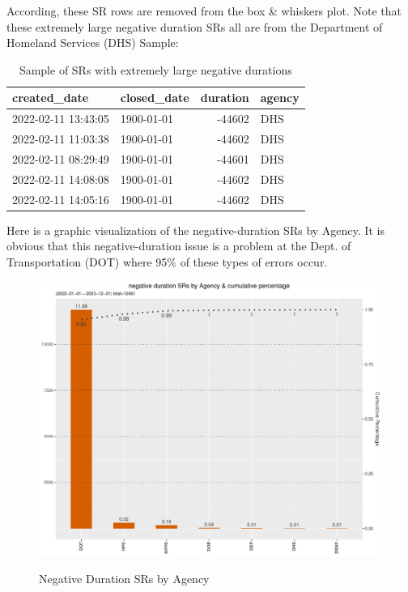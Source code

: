 \documentclass[12pt, titlepage]{article}
\begin{document}
{According, these  SR rows are removed from the box \& whiskers plot. Note that these extremely large negative duration SRs all
are from the Department of Homeland Services (DHS) Sample: 

\begin{table}[tbp]
    \centering
    \caption{Sample of SRs with extremely large negative durations}
    \normalsize
    \begin{tabular}{l l r l}
        \toprule
        \textbf{created\_date} & \textbf{closed\_date} & \textbf{duration} & \textbf{agency} \\
	        \midrule
	        2022-02-11 13:43:05 & 1900-01-01 & -44602 & DHS \\
	        2022-02-11 11:03:38 & 1900-01-01 & -44602 & DHS \\
	        2022-02-11 08:29:49 & 1900-01-01 & -44601 & DHS \\
	        2022-02-11 14:08:08 & 1900-01-01 & -44602 & DHS \\
	        2022-02-11 14:05:16 & 1900-01-01 & -44602 & DHS \\
	        \bottomrule
    \end{tabular}
    \label{tab:extreme_negative_durations}
\end{table}

Here is a graphic visualization of the negative-duration SRs by Agency. It is obvious that this
negative-duration issue is a problem at the Dept. of Transportation (DOT) where 95\% of these
types of errors occur. 

\begin{figure}[tbp]
 	 \centering
 	 \caption{Negative Duration SRs by Agency}
	  \includegraphics[width = \textwidth]{negative_duration_SR_barchart.pdf}
	  \label{fig:negative-duration}
\end{figure}

}
\end{document}
